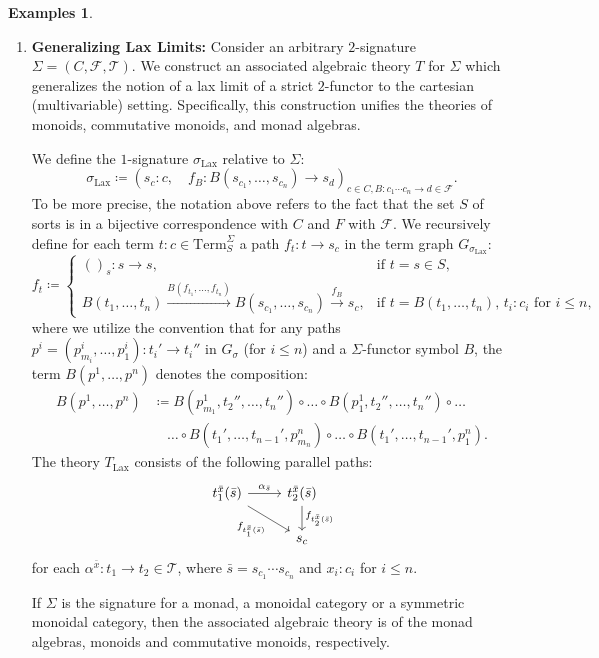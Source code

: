 \documentclass[11pt]{article}
\theoremstyle{plain}
\theoremstyle{definition}
\newtheorem{examples}[theorem]{Examples}
\numberwithin{equation}{section}
\newcommand{\Term}{\mathrm{Term}}
\begin{document}
\begin{examples}
\begin{enumerate}
\item \textbf{Generalizing Lax Limits:}
    Consider an arbitrary $2$-signature $\Sigma = (C,\mathcal{F},\mathcal{T})$. We construct an associated algebraic theory $T$ for $\Sigma$ which generalizes the notion of a lax limit of a strict $2$-functor to the cartesian (multivariable) setting. Specifically, this construction unifies the theories of monoids, commutative monoids, and monad algebras.
    
    We define the $1$-signature $\sigma_{\text{Lax}}$ relative to $\Sigma$:
    $$
    \sigma_{\text{Lax}} \coloneqq \left(s_c\colon c, \quad f_B\colon B(s_{c_1},\dots, s_{c_n})\to s_d\right)_{c\in C,B\colon c_1\cdots c_n\to d\in\mathcal{F}}.
    $$
    To be more precise, the notation above refers to the fact that the set $S$ of sorts is in a bijective correspondence with $C$ and $F$ with $\mathcal{F}$. We recursively define for each term $t \colon c \in \Term_S^\Sigma$ a path $f_t \colon t \to s_c$ in the term graph $G_{\sigma_{\text{Lax}}}$:
    {\small
    $$
    f_t\coloneqq \begin{cases}
        ()_{s}\colon s\to s, & \text{if $t = s\in S$,}\\
        B(t_1, \dots, t_n) \xrightarrow{B(f_{t_1}, \dots, f_{t_n})} B(s_{c_1}, \dots, s_{c_n}) \xrightarrow{f_B} s_c, & \text{if $t = B(t_1,\dots, t_n)$, $t_i\colon c_i$ for $i\leq n$,}
    \end{cases}
    $$
    }
    where we utilize the convention that for any paths $p^i = (p^i_{m_i},\dots, p^i_1)\colon t_i'\to t_i''$ in $G_\sigma$ (for $i\leq n$) and a $\Sigma$-functor symbol $B$, the term $B(p^1, \dots, p^n)$ denotes the composition:
    \begin{align*}
        B(p^1,\dots, p^n) &\coloneqq B(p^1_{m_1},t_2'',\dots, t_n'')\circ\dots\circ B(p^1_1,t_2'',\dots, t_n'') \circ \dots \\
        &\quad \dots \circ B(t_1',\dots, t_{n-1}',p^n_{m_n})\circ\dots\circ B(t_1',\dots, t_{n-1}', p^n_1).
    \end{align*}
    The theory $T_{\text{Lax}}$ consists of the following parallel paths:
    \[
    \begin{tikzcd}
    t_1^{\bar{x}}(\bar{s}) \arrow[r, "\alpha_{\bar{s}}"] \arrow[rd, "f_{t_1^{\bar{x}}(\bar{s})}"'] & t_2^{\bar{x}}(\bar{s}) \arrow[d, "f_{t_2^{\bar{x}}(\bar{s})}"] \\
                                                                                                   & s_c                                                           
    \end{tikzcd}
    \]
    for each $\alpha^{\bar{x}}\colon t_1\to t_2\in \mathcal{T}$, where $\bar{s} = s_{c_1}\cdots s_{c_n}$ and $x_i\colon c_i$ for $i\leq n$. 
    
    If $\Sigma$ is the signature for a monad, a monoidal category or a symmetric monoidal category, then the associated algebraic theory is of the monad algebras, monoids and commutative monoids, respectively.
       \end{enumerate}

\end{examples}
\end{document}
